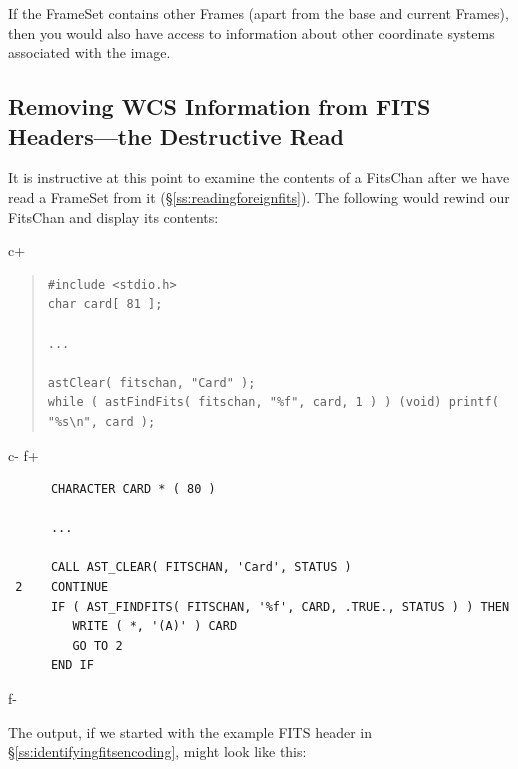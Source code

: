 \documentclass[twoside,11pt]{article}
\newcommand{\secref}[1]{\S\ref{#1}}
\newcommand{\secref}[1]{\ref{#1}}
\begin{document}
If the FrameSet contains other Frames (apart from the base and current
Frames), then you would also have access to information about other
coordinate systems associated with the image.

\subsection{\label{ss:destructiveread}Removing WCS Information from FITS Headers---the Destructive Read}

It is instructive at this point to examine the contents of a FitsChan
after we have read a FrameSet from it
(\secref{ss:readingforeignfits}). The following would rewind our
FitsChan and display its contents:

c+
\begin{quote}
\small
\begin{verbatim}
#include <stdio.h>
char card[ 81 ];

...

astClear( fitschan, "Card" );
while ( astFindFits( fitschan, "%f", card, 1 ) ) (void) printf( "%s\n", card );
\end{verbatim}
\normalsize
\end{quote}
c-
f+
\small
\begin{verbatim}
      CHARACTER CARD * ( 80 )

      ...

      CALL AST_CLEAR( FITSCHAN, 'Card', STATUS )
 2    CONTINUE
      IF ( AST_FINDFITS( FITSCHAN, '%f', CARD, .TRUE., STATUS ) ) THEN
         WRITE ( *, '(A)' ) CARD
         GO TO 2
      END IF
\end{verbatim}
\normalsize
f-

The output, if we started with the example FITS header in
\secref{ss:identifyingfitsencoding}, might look like this:
\end{document}
